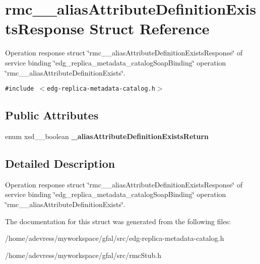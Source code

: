 \section{rmc\_\-\_\-alias\-Attribute\-Definition\-Exists\-Response Struct Reference}
\label{structrmc____aliasAttributeDefinitionExistsResponse}
Operation response struct \char`\"{}rmc\_\-\_\-alias\-Attribute\-Definition\-Exists\-Response\char`\"{} of service binding \char`\"{}edg\_\-replica\_\-metadata\_\-catalog\-Soap\-Binding\char`\"{} operation \char`\"{}rmc\_\-\_\-alias\-Attribute\-Definition\-Exists\char`\"{}.  


{\tt \#include $<$edg-replica-metadata-catalog.h$>$}

\subsection*{Public Attributes}
\begin{CompactItemize}
\item 
enum xsd\_\-\_\-boolean \textbf{\_\-alias\-Attribute\-Definition\-Exists\-Return}\label{structrmc____aliasAttributeDefinitionExistsResponse_449aa2e46735a87af8cceeb366468b02}

\end{CompactItemize}


\subsection{Detailed Description}
Operation response struct \char`\"{}rmc\_\-\_\-alias\-Attribute\-Definition\-Exists\-Response\char`\"{} of service binding \char`\"{}edg\_\-replica\_\-metadata\_\-catalog\-Soap\-Binding\char`\"{} operation \char`\"{}rmc\_\-\_\-alias\-Attribute\-Definition\-Exists\char`\"{}. 



The documentation for this struct was generated from the following files:\begin{CompactItemize}
\item 
/home/adevress/myworkspace/gfal/src/edg-replica-metadata-catalog.h\item 
/home/adevress/myworkspace/gfal/src/rmc\-Stub.h\end{CompactItemize}
